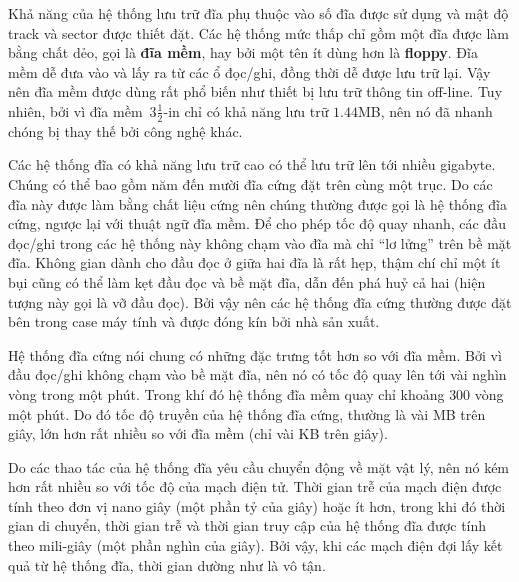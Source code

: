 Khả năng của hệ thống lưu trữ đĩa phụ thuộc vào số đĩa được sử dụng và mật độ track và
sector được thiết đặt. Các hệ thống mức thấp chỉ gồm một đĩa được làm bằng chất dẻo, gọi là \textbf{đĩa mềm}, hay bởi một tên ít dùng hơn là \textbf{floppy}. Đĩa mềm dễ đưa
vào và lấy ra từ các ổ đọc/ghi, đồng thời dễ được lưu trữ lại. Vậy nên đĩa mềm được
dùng rất phổ biến như thiết bị lưu trữ thông tin off-line. Tuy nhiên, bởi vì đĩa
mềm~$3\frac{1}{2}$-in chỉ có khả năng lưu trữ $1.44$MB, nên nó đã nhanh chóng
bị thay thế bởi công nghệ khác.

Các hệ thống đĩa có khả năng lưu trữ cao có thể lưu trữ lên tới nhiều gigabyte. Chúng có
thể bao gồm năm đến mười đĩa cứng đặt trên cùng một trục. Do các đĩa này được làm bằng
chất liệu cứng nên chúng thường được gọi là hệ thống đĩa cứng, ngược lại với thuật ngữ đĩa
mềm. Để cho phép tốc độ quay nhanh, các đầu đọc/ghi trong các hệ thống này không chạm vào
đĩa mà chỉ ``lơ lửng'' trên bề mặt đĩa. Không gian dành cho đầu đọc ở giữa hai đĩa là rất
hẹp, thậm chí chỉ một ít bụi cũng có thể làm kẹt đầu đọc và bề mặt đĩa, dẫn đến phá huỷ cả
hai (hiện tượng này gọi là vỡ đầu đọc). Bởi vậy nên các hệ thống đĩa cứng thường được đặt
bên trong case máy tính và được đóng kín bởi nhà sản xuất.



Hệ thống đĩa cứng nói chung có những đặc trưng tốt hơn so với đĩa mềm. Bởi vì đầu đọc/ghi
không chạm vào bề mặt đĩa, nên nó có tốc độ quay lên tới vài nghìn vòng trong một
phút. Trong khí đó hệ thống đĩa mềm quay chỉ khoảng $300$ vòng một phút. Do đó tốc độ
truyền của hệ thống đĩa cứng, thường là vài MB trên giây, lớn hơn rất nhiều so với đĩa mềm
(chỉ vài KB trên giây).

Do các thao tác của hệ thống đĩa yêu cầu chuyển động về mặt vật lý, nên nó kém hơn rất
nhiều so với tốc độ của mạch điện tử. Thời gian trễ của mạch điện được tính theo đơn vị
nano giây (một phần tỷ của giây) hoặc ít hơn, trong khi đó thời gian di chuyển, thời gian
trễ và thời gian truy cập của hệ thống đĩa được tính theo mili-giây (một phần nghìn của
giây). Bởi vậy, khi các mạch điện đợi lấy kết quả từ hệ thống đĩa, thời gian dường như là
vô tận.

